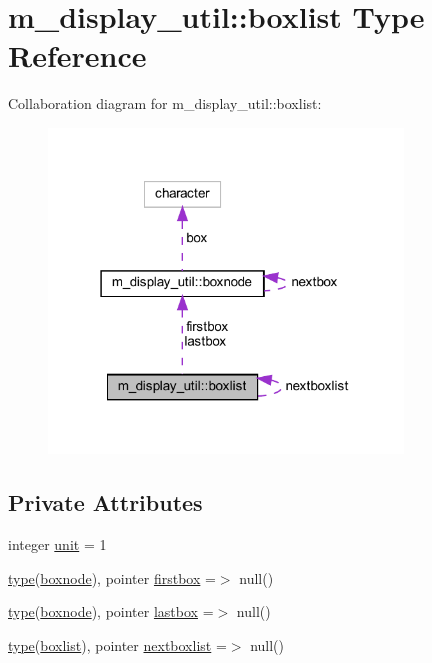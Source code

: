 \hypertarget{structm__display__util_1_1boxlist}{}\section{m\+\_\+display\+\_\+util\+:\+:boxlist Type Reference}
\label{structm__display__util_1_1boxlist}


Collaboration diagram for m\+\_\+display\+\_\+util\+:\+:boxlist\+:
\nopagebreak
\begin{figure}[H]
\begin{center}
\leavevmode
\includegraphics[width=267pt]{structm__display__util_1_1boxlist__coll__graph}
\end{center}
\end{figure}
\subsection*{Private Attributes}
\begin{DoxyCompactItemize}
\item 
integer \hyperlink{structm__display__util_1_1boxlist_a25d8047955ec4e12f09ff9233ba5c666}{unit} = 1
\item 
\hyperlink{stop__watch_83_8txt_a70f0ead91c32e25323c03265aa302c1c}{type}(\hyperlink{structm__display__util_1_1boxnode}{boxnode}), pointer \hyperlink{structm__display__util_1_1boxlist_ada3bfedc8682447158b2b0e4b662773a}{firstbox} =$>$ null()
\item 
\hyperlink{stop__watch_83_8txt_a70f0ead91c32e25323c03265aa302c1c}{type}(\hyperlink{structm__display__util_1_1boxnode}{boxnode}), pointer \hyperlink{structm__display__util_1_1boxlist_ada85bf1694f8522fa4f401c7e7dd34d3}{lastbox} =$>$ null()
\item 
\hyperlink{stop__watch_83_8txt_a70f0ead91c32e25323c03265aa302c1c}{type}(\hyperlink{structm__display__util_1_1boxlist}{boxlist}), pointer \hyperlink{structm__display__util_1_1boxlist_a51aeeb63272988f526937af58361c577}{nextboxlist} =$>$ null()
\end{DoxyCompactItemize}



